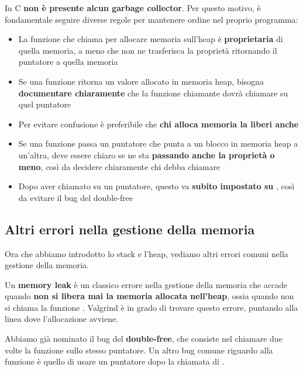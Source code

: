 \documentclass[11pt, a4paper, titlepage, oneside]{scrbook}
\begin{document}
\begin{Osservazione}
\label{oss-no-garbage-collector}
In C \textbf{non è presente alcun garbage collector}. Per questo motivo, è fondamentale seguire diverse regole per mantenere ordine nel proprio programma:
\begin{itemize}
    \item La funzione che chiama  per allocare memoria sull'heap è \textbf{proprietaria} di quella memoria, a meno che non ne trasferisca la proprietà ritornando il puntatore a quella memoria
    \item Se una funzione ritorna un valore allocato in memoria heap, bisogna \textbf{documentare chiaramente} che la funzione chiamante dovrà chiamare  su quel puntatore
    \item Per evitare confusione è preferibile che \textbf{chi alloca memoria la liberi anche}
    \item Se una funzione passa un puntatore che punta a un blocco in memoria heap a un'altra, deve essere chiaro se ne sta \textbf{passando anche la proprietà o meno}, così da decidere chiaramente chi debba chiamare 
    \item Dopo aver chiamato  su un puntatore, questo va \textbf{subito impostato su} , così da evitare il bug del double-free
\end{itemize}
\end{Osservazione}

\subsection{Altri errori nella gestione della memoria}

Ora che abbiamo introdotto lo stack e l'heap, vediamo altri errori comuni nella gestione della memoria.

\begin{Definizione}
\label{def-memory-leaks}
Un \textbf{memory leak} è un classico errore nella gestione della memoria che accade quando \textbf{non si libera mai la memoria allocata nell'heap}, ossia quando non si chiama la funzione . Valgrind è in grado di trovare questo errore, puntando alla linea dove l'allocazione avviene.
\end{Definizione}

\begin{Definizione}
\label{def-bug-free}
Abbiamo già nominato il bug del \textbf{double-free}, che consiste nel chiamare due volte la funzione  sullo stesso puntatore. Un altro bug comune riguardo alla funzione  è quello di usare un puntatore dopo la chiamata di .
\end{Definizione}
\end{document}
